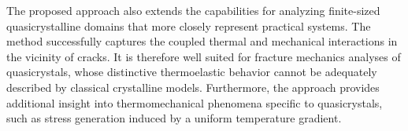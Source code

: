 The proposed approach also extends the capabilities for analyzing
finite-sized quasicrystalline domains that more closely represent
practical systems. The method successfully captures the coupled thermal
and mechanical interactions in the vicinity of cracks. It is therefore
well suited for fracture mechanics analyses of quasicrystals, whose
distinctive thermoelastic behavior cannot be adequately described by
classical crystalline models. Furthermore, the approach provides
additional insight into thermomechanical phenomena specific to
quasicrystals, such as stress generation induced by a uniform
temperature gradient.




